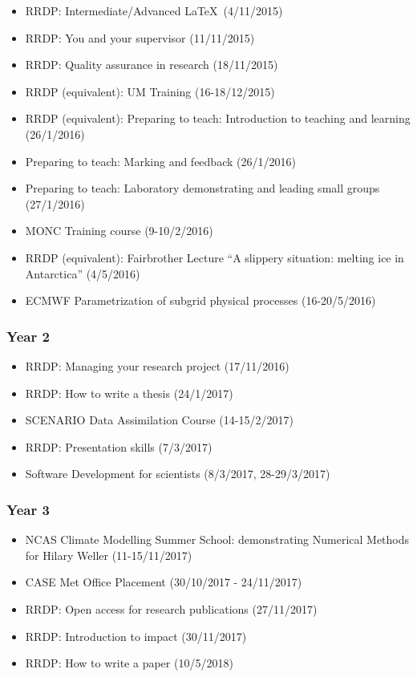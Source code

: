 \documentclass[11pt,a4paper]{article}
\begin{document}
\begin{itemize}
  \item RRDP: Intermediate/Advanced \LaTeX\ (4/11/2015)
  \item RRDP: You and your supervisor (11/11/2015)
  \item RRDP: Quality assurance in research (18/11/2015)
  \item RRDP (equivalent): UM Training (16-18/12/2015)
  \item RRDP (equivalent): Preparing to teach: Introduction to teaching and learning (26/1/2016)
  \item Preparing to teach: Marking and feedback (26/1/2016)
  \item Preparing to teach: Laboratory demonstrating and leading small groups (27/1/2016)
  \item MONC Training course (9-10/2/2016)
  \item RRDP (equivalent): Fairbrother Lecture ``A slippery situation: melting ice in Antarctica'' (4/5/2016)
  \item ECMWF Parametrization of subgrid physical processes (16-20/5/2016)
\end{itemize}

\subsubsection*{Year 2}

\begin{itemize}
  \item RRDP: Managing your research project (17/11/2016)
  \item RRDP: How to write a thesis (24/1/2017)
  \item SCENARIO Data Assimilation Course (14-15/2/2017)
  \item RRDP: Presentation skills (7/3/2017)
  \item Software Development for scientists (8/3/2017, 28-29/3/2017)
\end{itemize}

\subsubsection*{Year 3}

\begin{itemize}
  \item NCAS Climate Modelling Summer School: demonstrating Numerical Methods for Hilary Weller (11-15/11/2017)
  \item CASE Met Office Placement (30/10/2017 - 24/11/2017)
  \item RRDP: Open access for research publications (27/11/2017)
  \item RRDP: Introduction to impact (30/11/2017)
  \item RRDP: How to write a paper (10/5/2018)
\end{itemize}
\end{document}
